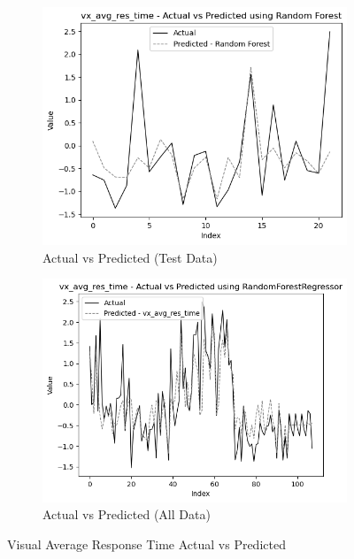 \begin{figure}[htbp]
    \centering
    \begin{subfigure}[b]{0.49\textwidth}
        \centering
        \includegraphics[width=\textwidth]{images/regressionCharts/test_data_visual_average_response_time.png}
        \caption{Actual vs Predicted (Test Data)}
        \label{fig:actual_vs_predicted_vx_avg_res_time_test}
    \end{subfigure}\hfill
    \begin{subfigure}[b]{0.49\textwidth}
        \centering
        \includegraphics[width=\textwidth]{images/regressionCharts/all_data_visual_average_response_time.png}
        \caption{Actual vs Predicted (All Data)}
        \label{fig:actual_vs_predicted_vx_avg_res_time_all_data}
    \end{subfigure}
    \caption{Visual Average Response Time Actual vs Predicted}
    \label{fig:visual_avg_response_time_comparison}
\end{figure}

